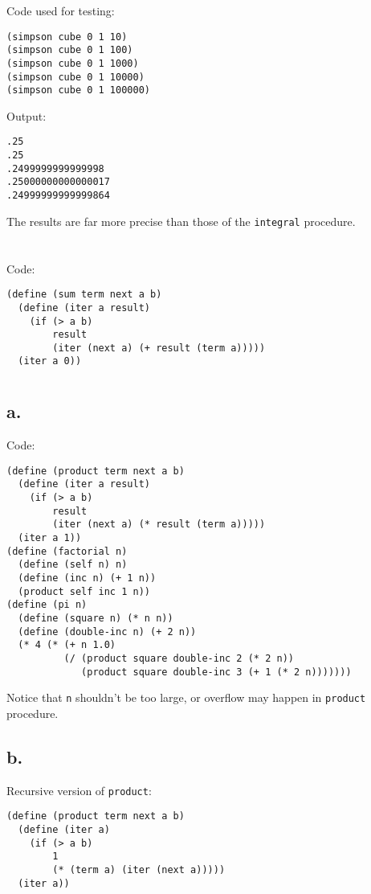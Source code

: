 \documentclass[a4paper]{report}
\begin{document}
Code used for testing:

\begin{lstlisting}
(simpson cube 0 1 10)
(simpson cube 0 1 100)
(simpson cube 0 1 1000)
(simpson cube 0 1 10000)
(simpson cube 0 1 100000)
\end{lstlisting}

Output:

\begin{lstlisting}
.25
.25
.2499999999999998
.25000000000000017
.24999999999999864
\end{lstlisting}

The results are far more precise than
 those of the \lstinline{integral}
 procedure.


\section{}

Code:

\begin{lstlisting}
(define (sum term next a b)
  (define (iter a result)
    (if (> a b)
        result
        (iter (next a) (+ result (term a)))))
  (iter a 0))
\end{lstlisting}


\section{}

\subsection*{a.}

Code:

\begin{lstlisting}
(define (product term next a b)
  (define (iter a result)
    (if (> a b)
        result
        (iter (next a) (* result (term a)))))
  (iter a 1))
(define (factorial n)
  (define (self n) n)
  (define (inc n) (+ 1 n))
  (product self inc 1 n))
(define (pi n)
  (define (square n) (* n n))
  (define (double-inc n) (+ 2 n))
  (* 4 (* (+ n 1.0)
          (/ (product square double-inc 2 (* 2 n))
             (product square double-inc 3 (+ 1 (* 2 n)))))))
\end{lstlisting}

Notice that \lstinline{n} shouldn't be
 too large, or overflow may happen in
 \lstinline{product} procedure.

\subsection*{b.}

Recursive version of \lstinline{product}:

\begin{lstlisting}
(define (product term next a b)
  (define (iter a)
    (if (> a b)
        1
        (* (term a) (iter (next a)))))
  (iter a))
\end{lstlisting}
\end{document}
